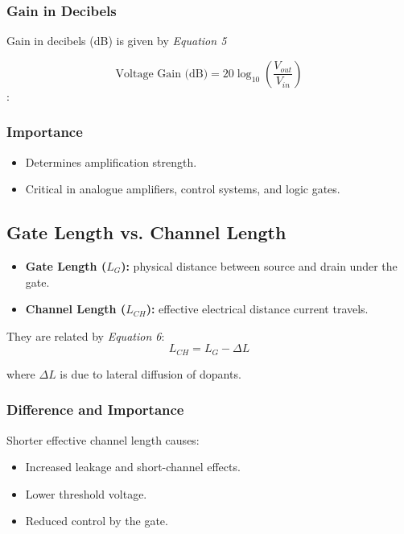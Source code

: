 \documentclass[a4paper,12pt]{article}
\begin{document}
\subsubsection{Gain in Decibels}
Gain in decibels (dB) is given by \textit{Equation 5}

\begin{equation}
\text{Voltage Gain (dB)} = 20 \log_{10}\left(\frac{V_{out}}{V_{in}}\right)    
\end{equation}:


\subsubsection{Importance}
\begin{itemize}
    \item Determines amplification strength.
    \item Critical in analogue amplifiers, control systems, and logic gates.
\end{itemize}

\subsection{Gate Length vs. Channel Length}

\begin{itemize}
    \item \textbf{Gate Length ($L_G$):} physical distance between source and drain under the gate.
    \item \textbf{Channel Length ($L_{CH}$):} effective electrical distance current travels.
\end{itemize}

They are related by \textit{Equation 6}:
\begin{equation}
L_{CH} = L_G - \Delta L    
\end{equation}

where $\Delta L$ is due to lateral diffusion of dopants.

\subsubsection{Difference and Importance}
Shorter effective channel length causes:
\begin{itemize}
    \item Increased leakage and short-channel effects.
    \item Lower threshold voltage.
    \item Reduced control by the gate.
\end{itemize}
\end{document}
